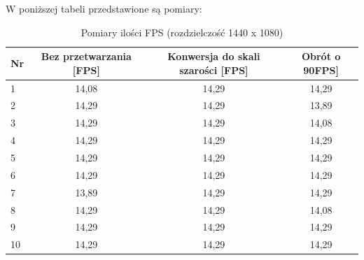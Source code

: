 \documentclass[a4paper,11pt,twoside]{report}
\theoremstyle{definition}
\begin{document}
\begin{description}
W poniższej tabeli przedstawione są pomiary:
\begin{table}[H]
\centering
\begin{tabular}{lccc}
Nr & Bez przetwarzania {[}FPS{]} & Konwersja do skali szarości {[}FPS{]} & Obrót o 90\textdegree {[}FPS{]} \\ \hline
1  & 14,08                       & 14,29                                 & 14,29                           \\
2  & 14,29                       & 14,29                                 & 13,89                           \\
3  & 14,29                       & 14,29                                 & 14,08                           \\
4  & 14,29                       & 14,29                                 & 14,29                           \\
5  & 14,29                       & 14,29                                 & 14,29                           \\
6  & 14,29                       & 14,29                                 & 14,29                           \\
7  & 13,89                       & 14,29                                 & 14,29                           \\
8  & 14,29                       & 14,29                                 & 14,08                           \\
9  & 14,29                       & 14,29                                 & 14,29                           \\
10 & 14,29                       & 14,29                                 & 14,29                           
\end{tabular}
\caption{Pomiary ilości FPS (rozdzielczość 1440 x 1080)}
\end{table}


\end{description}
\end{document}

